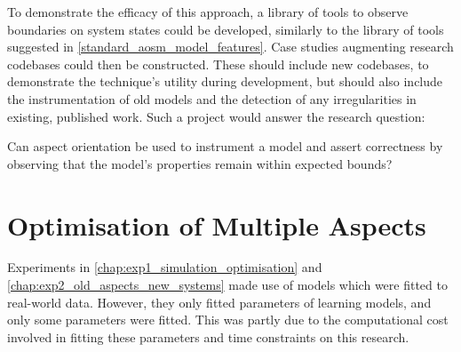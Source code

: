 To demonstrate the efficacy of this approach, a library of tools to observe
boundaries on system states could be developed, similarly to the library of
tools suggested in \cref{standard_aosm_model_features}. Case studies augmenting
research codebases could then be constructed. These should include new
codebases, to demonstrate the technique's utility during development, but should
also include the instrumentation of old models and the detection of any
irregularities in existing, published work. Such a project would answer the
research question:

\begin{researchquestion}
    Can aspect orientation be used to instrument a model and assert correctness
    by observing that the model's properties remain within expected bounds?
\end{researchquestion}








\section{Optimisation of Multiple
Aspects}\label{future_work_many_aspectual_models_to_optimise}

Experiments in \cref{chap:exp1_simulation_optimisation} and
\cref{chap:exp2_old_aspects_new_systems} made use of models which were fitted to
real-world data. However, they only fitted parameters of learning models, and
only some parameters were fitted. This was partly due to the
computational cost involved in fitting these parameters and time constraints on
this research.

